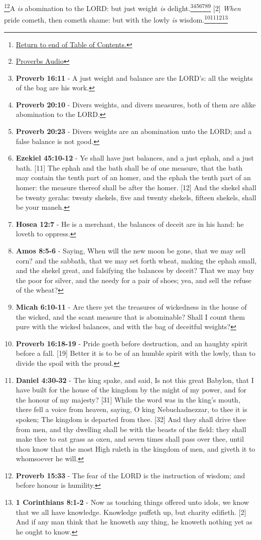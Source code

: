 \footnote{\textcolor[cmyk]{0.99998,1,0,0}{\hyperlink{TOC}{Return to end of Table of Contents.}}}\footnote{\href{https://www.audioverse.org/english/audiobibles/books/ENGKJV/O/Prov/1}{\textcolor[cmyk]{0.99998,1,0,0}{Proverbs Audio}}}\textcolor[cmyk]{0.99998,1,0,0}{A  \emph{is} abomination to the LORD: but  just weight \emph{is}  delight.}\footnote{\textbf{Proverb 16:11} - A just weight and balance are the LORD's: all the weights of the bag are his work.}\footnote{\textbf{Proverb 20:10} - Divers weights, and divers measures, both of them are alike abomination to the LORD.}\footnote{\textbf{Proverb 20:23} - Divers weights are an abomination unto the LORD; and a false balance is not good.}\footnote{\textbf{Ezekiel 45:10-12} - Ye shall have just balances, and a just ephah, and a just bath. [11] The ephah and the bath shall be of one measure, that the bath may contain the tenth part of an homer, and the ephah the tenth part of an homer: the measure thereof shall be after the homer. [12] And the shekel shall be twenty gerahs: twenty shekels, five and twenty shekels, fifteen shekels, shall be your maneh.}\footnote{\textbf{Hosea 12:7} - He is a merchant, the balances of deceit are in his hand: he loveth to oppress.}\footnote{\textbf{Amos 8:5-6} - Saying, When will the new moon be gone, that we may sell corn? and the sabbath, that we may set forth wheat, making the ephah small, and the shekel great, and falsifying the balances by deceit? That we may buy the poor for silver, and the needy for a pair of shoes; yea, and sell the refuse of the wheat?}\footnote{\textbf{Micah 6:10-11} - Are there yet the treasures of wickedness in the house of the wicked, and the scant measure that is abominable? Shall I count them pure with the wicked balances, and with the bag of deceitful weights?}
[2] \textcolor[cmyk]{0.99998,1,0,0}{\emph{When} pride cometh, then cometh shame: but with the lowly \emph{is} wisdom.}\footnote{\textbf{Proverb 16:18-19} - Pride goeth before destruction, and an haughty spirit before a fall. [19] Better it is to be of an humble spirit with the lowly, than to divide the spoil with the proud.}\footnote{\textbf{Daniel 4:30-32} - The king spake, and said, Is not this great Babylon, that I have built for the house of the kingdom by the might of my power, and for the honour of my majesty? [31] While the word was in the king's mouth, there fell a voice from heaven, saying, O king Nebuchadnezzar, to thee it is spoken; The kingdom is departed from thee. [32] And they shall drive thee from men, and thy dwelling shall be with the beasts of the field: they shall make thee to eat grass as oxen, and seven times shall pass over thee, until thou know that the most High ruleth in the kingdom of men, and giveth it to whomsoever he will.}\footnote{\textbf{Proverb 15:33} - The fear of the LORD is the instruction of wisdom; and before honour is humility.}\footnote{\textbf{1 Corinthians 8:1-2} - Now as touching things offered unto idols, we know that we all have knowledge. Knowledge puffeth up, but charity edifieth. [2] And if any man think that he knoweth any thing, he knoweth nothing yet as he ought to know.}
